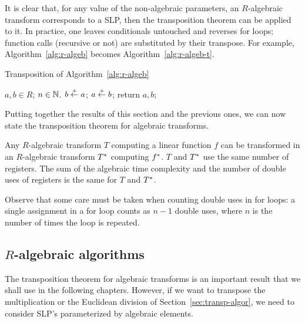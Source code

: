  
It is clear that, for any value of the non-algebraic parameters, an
$R$-algebraic transform corresponds to a SLP, then the transposition
theorem can be applied to it. In practice, one leaves conditionals
untouched and reverses for loops; function calls (recursive or not)
are substituted by their transpose. For example,
Algorithm~\ref{alg:r-algeb} becomes Algorithm~\ref{alg:r-algeb-t}.

\begin{algorithm}
  \caption{\label{alg:r-algeb-t}Transposition of
    Algorithm~\ref{alg:r-algeb}}
  \begin{algorithmic}
    \REQUIRE $a,b\in R$; $n\in\mathbb{N}$.
    \STATE $b \overset{+}{\leftarrow} a$;
    \ELSE
    \STATE $a \overset{+}{\leftarrow} b$;
    \ENDIF
    \ENDFOR
    \STATE return $a,b$;
  \end{algorithmic}
\end{algorithm}

Putting together the results of this section and the previous ones, we
can now state the transposition theorem for algebraic transforms.

\begin{theorem}
  \label{th:tellegen-R-algeb}
  Any $R$-algebraic transform $T$ computing a linear function
  $f$ can be transformed in an $R$-algebraic transform $T^\ast$
  computing $f^\ast$.  $T$ and $T^\ast$ use the same number of
  registers. The sum of the algebraic time complexity and the number
  of double uses of registers is the same for $T$ and $T^\ast$.
\end{theorem}

\begin{nota}
  Observe that some care must be taken when counting double uses in
  for loops: a single assignment in a for loop counts as $n-1$ double
  uses, where $n$ is the number of times the loop is repeated.
\end{nota}


\subsection{$R$-algebraic algorithms}
\label{sec:r-algebr-algor}
The transposition theorem for algebraic transforms is an important
result that we shall use in the following chapters. However, if we
want to transpose the multiplication or the Euclidean division of
Section~\ref{sec:transp-algor}, we need to consider SLP's
parameterized by algebraic elements.

